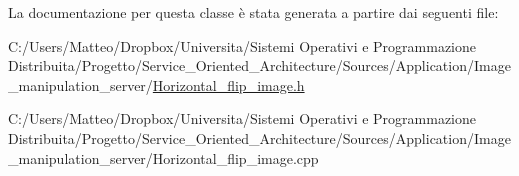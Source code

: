 La documentazione per questa classe è stata generata a partire dai seguenti file\-:\begin{DoxyCompactItemize}
\item 
C\-:/\-Users/\-Matteo/\-Dropbox/\-Universita/\-Sistemi Operativi e Programmazione Distribuita/\-Progetto/\-Service\-\_\-\-Oriented\-\_\-\-Architecture/\-Sources/\-Application/\-Image\-\_\-manipulation\-\_\-server/\hyperlink{_horizontal__flip__image_8h}{Horizontal\-\_\-flip\-\_\-image.\-h}\item 
C\-:/\-Users/\-Matteo/\-Dropbox/\-Universita/\-Sistemi Operativi e Programmazione Distribuita/\-Progetto/\-Service\-\_\-\-Oriented\-\_\-\-Architecture/\-Sources/\-Application/\-Image\-\_\-manipulation\-\_\-server/Horizontal\-\_\-flip\-\_\-image.\-cpp\end{DoxyCompactItemize}
